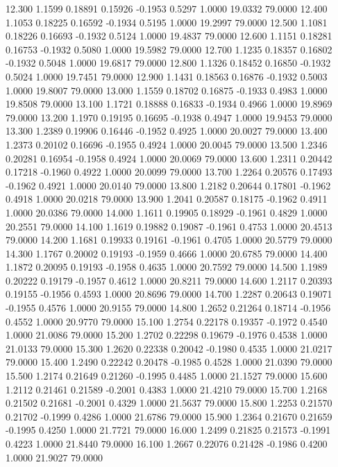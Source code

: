   12.300   1.1599   0.18891   0.15926  -0.1953   0.5297   1.0000  19.0332  79.0000
  12.400   1.1053   0.18225   0.16592  -0.1934   0.5195   1.0000  19.2997  79.0000
  12.500   1.1081   0.18226   0.16693  -0.1932   0.5124   1.0000  19.4837  79.0000
  12.600   1.1151   0.18281   0.16753  -0.1932   0.5080   1.0000  19.5982  79.0000
  12.700   1.1235   0.18357   0.16802  -0.1932   0.5048   1.0000  19.6817  79.0000
  12.800   1.1326   0.18452   0.16850  -0.1932   0.5024   1.0000  19.7451  79.0000
  12.900   1.1431   0.18563   0.16876  -0.1932   0.5003   1.0000  19.8007  79.0000
  13.000   1.1559   0.18702   0.16875  -0.1933   0.4983   1.0000  19.8508  79.0000
  13.100   1.1721   0.18888   0.16833  -0.1934   0.4966   1.0000  19.8969  79.0000
  13.200   1.1970   0.19195   0.16695  -0.1938   0.4947   1.0000  19.9453  79.0000
  13.300   1.2389   0.19906   0.16446  -0.1952   0.4925   1.0000  20.0027  79.0000
  13.400   1.2373   0.20102   0.16696  -0.1955   0.4924   1.0000  20.0045  79.0000
  13.500   1.2346   0.20281   0.16954  -0.1958   0.4924   1.0000  20.0069  79.0000
  13.600   1.2311   0.20442   0.17218  -0.1960   0.4922   1.0000  20.0099  79.0000
  13.700   1.2264   0.20576   0.17493  -0.1962   0.4921   1.0000  20.0140  79.0000
  13.800   1.2182   0.20644   0.17801  -0.1962   0.4918   1.0000  20.0218  79.0000
  13.900   1.2041   0.20587   0.18175  -0.1962   0.4911   1.0000  20.0386  79.0000
  14.000   1.1611   0.19905   0.18929  -0.1961   0.4829   1.0000  20.2551  79.0000
  14.100   1.1619   0.19882   0.19087  -0.1961   0.4753   1.0000  20.4513  79.0000
  14.200   1.1681   0.19933   0.19161  -0.1961   0.4705   1.0000  20.5779  79.0000
  14.300   1.1767   0.20002   0.19193  -0.1959   0.4666   1.0000  20.6785  79.0000
  14.400   1.1872   0.20095   0.19193  -0.1958   0.4635   1.0000  20.7592  79.0000
  14.500   1.1989   0.20222   0.19179  -0.1957   0.4612   1.0000  20.8211  79.0000
  14.600   1.2117   0.20393   0.19155  -0.1956   0.4593   1.0000  20.8696  79.0000
  14.700   1.2287   0.20643   0.19071  -0.1955   0.4576   1.0000  20.9155  79.0000
  14.800   1.2652   0.21264   0.18714  -0.1956   0.4552   1.0000  20.9770  79.0000
  15.100   1.2754   0.22178   0.19357  -0.1972   0.4540   1.0000  21.0086  79.0000
  15.200   1.2702   0.22298   0.19679  -0.1976   0.4538   1.0000  21.0133  79.0000
  15.300   1.2620   0.22338   0.20042  -0.1980   0.4535   1.0000  21.0217  79.0000
  15.400   1.2490   0.22242   0.20478  -0.1985   0.4528   1.0000  21.0390  79.0000
  15.500   1.2174   0.21649   0.21260  -0.1995   0.4485   1.0000  21.1527  79.0000
  15.600   1.2112   0.21461   0.21589  -0.2001   0.4383   1.0000  21.4210  79.0000
  15.700   1.2168   0.21502   0.21681  -0.2001   0.4329   1.0000  21.5637  79.0000
  15.800   1.2253   0.21570   0.21702  -0.1999   0.4286   1.0000  21.6786  79.0000
  15.900   1.2364   0.21670   0.21659  -0.1995   0.4250   1.0000  21.7721  79.0000
  16.000   1.2499   0.21825   0.21573  -0.1991   0.4223   1.0000  21.8440  79.0000
  16.100   1.2667   0.22076   0.21428  -0.1986   0.4200   1.0000  21.9027  79.0000
